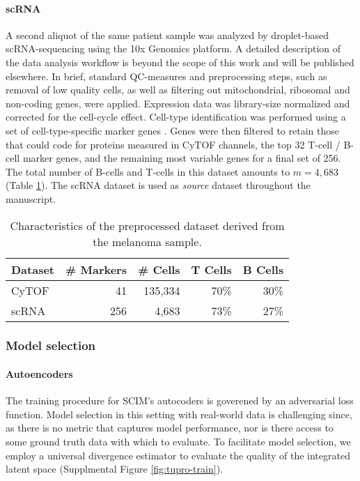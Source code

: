 \paragraph{scRNA}
A second aliquot of the same patient sample was analyzed by droplet-based scRNA-sequencing using the 10x Genomics platform.
A detailed description of the data analysis workflow is beyond the scope of this work and will be published elsewhere.
In brief, standard QC-measures and preprocessing steps, such as removal of low quality cells, as well as filtering out mitochondrial, ribosomal and non-coding genes, were applied.
Expression data was library-size normalized and corrected for the cell-cycle effect.
Cell-type identification was performed using a set of cell-type-specific marker genes \cite{tirosh2016}.
Genes were then filtered to retain those that could code for proteins measured in CyTOF channels, the top 32 T-cell / B-cell marker genes, and the remaining most variable genes for a final set of 256.
The total number of B-cells and T-cells in this dataset amounts to $m{=}4,683$ (Table \ref{tbl:tupro-dataset}).
The scRNA dataset is used as \textit{source} dataset throughout the manuscript.

\begin{table}[ht]
    \centering
    \begin{tabular}{lrrrr}
    \toprule
    Dataset &  \# Markers &  \# Cells &  T Cells &  B Cells \\
    \midrule
    CyTOF &         41 &   135,334 &       70\% &       30\% \\
    scRNA &       256 &     4,683 &       73\% &       27\% \\
    \bottomrule
    \end{tabular}
    \caption{
        Characteristics of the preprocessed dataset derived from the melanoma sample.
    }
    \label{tbl:tupro-dataset}
\end{table}

\subsubsection{Model selection}
\paragraph{Autoencoders}
The training procedure for SCIM's autocoders is goverened by an adversarial loss function.
Model selection in this setting with real-world data is challenging since, as there is no metric that captures model performance, nor is there access to some ground truth data with which to evaluate.
To facilitate model selection, we employ a universal divergence estimator \cite{wang2009} to evaluate the quality of the integrated latent space (Supplmental Figure \ref{fig:tupro-train}).

